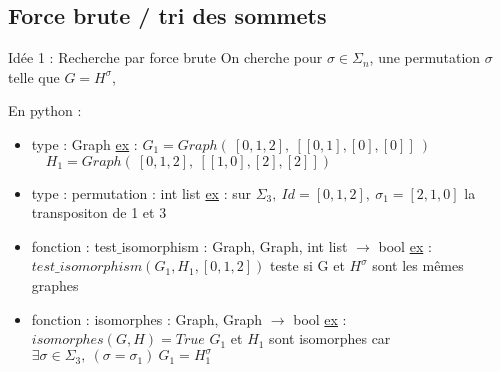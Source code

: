 \subsection{Force brute / tri des sommets}
\begin{frame}[fragile]{Idée 1 : Recherche par force brute}
\footnotesize
On cherche pour $\sigma \in \Sigma_n$, une permutation $\sigma$ telle que $G=H^\sigma$,

En python : 

\begin{itemize}
    \item type : \textcolor{charcoal}{Graph}
        \newline\underline{ex} : $G_1 = Graph(\ [0,1,2],\ [[0,1], [0], [0]]\ )$
        \newline $\quad H_1 = Graph(\ [0,1,2],\ [[1,0], [2], [2]] )$
    \item type : permutation : int list
        \newline \underline{ex} : sur $\Sigma_3,\ Id = [0,1,2],\ \sigma_1=[2,1,0]$ la transpositon de 1 et 3
    \item fonction : \textcolor{airforceblue}{test$\_$isomorphism} : Graph, Graph, int list $\longrightarrow$ bool
        \newline \underline{ex} : $test\_isomorphism( G_1, H_1 , [0,1,2])$
        \newline teste si G et $H^{\sigma}$ sont les mêmes graphes
    \item fonction : \textcolor{airforceblue}{isomorphes} : Graph, Graph $\longrightarrow$ bool
        \newline \underline{ex} : $isomorphes(G, H) = True$
        \newline $G_1$ et $H_1$ sont isomorphes car $\exists \sigma \in \Sigma_3,\ (\sigma=\sigma_1)\ G_1=H_1^{\sigma}$
\end{itemize}
\end{frame}

